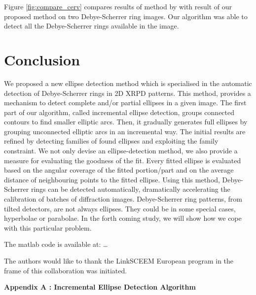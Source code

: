 \documentclass[preprint]{iucr}              %
\newcommand\dsr{Debye-Scherrer ring}
\newcommand\dsrs{Debye-Scherrer rings}
\begin{document}
Figure \ref{fig:compare_cerv} compares results of method by \cite{cervellino2006folding} with result of our proposed method on two {\dsr} images. Our algorithm was able to detect all the {\dsrs} available in the image.

\section{Conclusion}
We proposed a new ellipse detection method which is specialised in the automatic detection of \dsrs{} in 2D XRPD patterns. This method, provides a mechanism to detect complete and/or partial ellipses in a given image. The first part of our algorithm, called incremental ellipse detection, groups connected contours to find smaller elliptic arcs. Then, it gradually generates full ellipses by grouping unconnected elliptic arcs in an incremental way. The initial results are refined by detecting families of found ellipses and exploiting the family constraint. We not only devise an ellipse-detection method, we also provide a measure for evaluating the goodness of the fit. Every fitted ellipse is evaluated based on the angular coverage of the fitted portion/part and on the average distance of neighbouring points to the fitted ellipse.  Using this method, \dsrs{} can be detected automatically, dramatically accelerating the calibration of batches of  diffraction images. \dsr{} patterns, from tilted detectors, are not always ellipses. They could be in some special cases, hyperbolae or parabolae. In the forth coming study, we will show how we cope with this particular problem.

The matlab code is available at: \ldots

The authors would like to thank the LinkSCEEM European program in the frame of             this collaboration was initiated.  




\pagebreak
\appendix \textbf{Appendix A : Incremental Ellipse Detection Algorithm}
\end{document}
